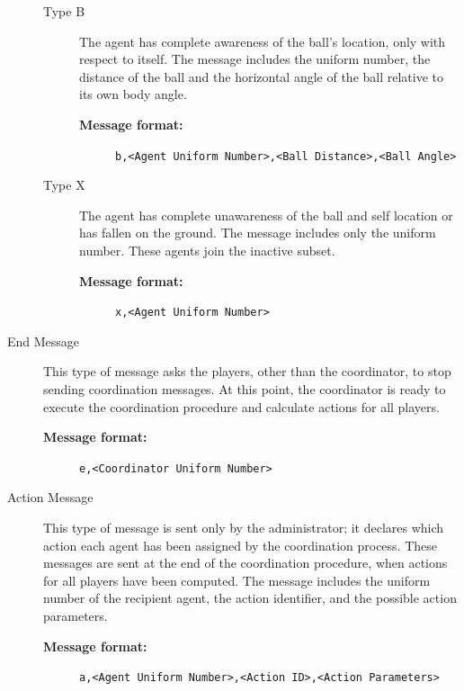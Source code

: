 \begin{description}
\begin{description}
\item[Type B] The agent has complete awareness of the ball's location, only with respect to itself. The message includes the uniform number, the distance of the ball and the horizontal angle of the ball relative to its own body angle.

\begin{description}
  \item[{\bf Message format:}]
\texttt{b,<Agent Uniform Number>,<Ball Distance>,<Ball Angle>}
\end{description}

\item[Type X] The agent has complete unawareness of the ball and self location or has fallen on the ground. The message includes only the uniform number. These agents join the inactive subset.

\begin{description}
 \item[{\bf Message format:}]
 \texttt{x,<Agent Uniform Number>}
\end{description}

\end{description}
\item[End Message]
This type of message asks the players, other than the coordinator, to stop sending coordination messages. At this point, the coordinator is ready to execute the coordination procedure and calculate actions for all players.
\begin{description}
  \item[{\bf Message format:}] 
  \texttt{e,<Coordinator Uniform Number>}
\end{description}
\item[Action Message]
This type of message is sent only by the administrator; it declares which action each agent has been assigned by the coordination process. These messages are sent at the end of the coordination procedure, when actions for all players have been computed. The message includes the uniform number of the recipient agent, the action identifier, and the possible action parameters. 
\begin{description}
  \item[{\bf Message format:}]
  \texttt{a,<Agent Uniform Number>,<Action ID>,<Action Parameters>}
\end{description}

\end{description}

